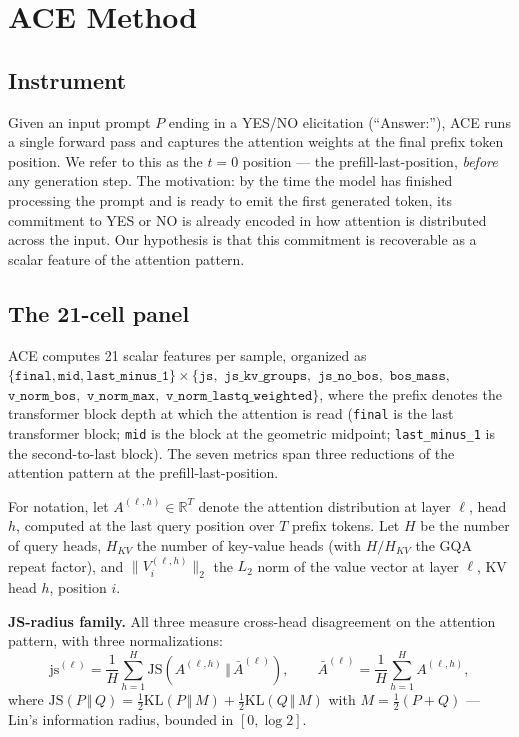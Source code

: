 \documentclass[10pt, letterpaper]{article}
\begin{document}
\section{ACE Method}
\label{sec:method}

\subsection{Instrument}
\label{sec:method:instrument}

Given an input prompt $P$ ending in a YES/NO elicitation
(``Answer:''), ACE runs a single forward pass and captures the
attention weights at the final prefix token position. We refer to this
as the $t{=}0$ position --- the prefill-last-position, \emph{before}
any generation step. The motivation: by the time the model has
finished processing the prompt and is ready to emit the first
generated token, its commitment to YES or NO is already encoded in how
attention is distributed across the input. Our hypothesis is that this
commitment is recoverable as a scalar feature of the attention
pattern.

\subsection{The 21-cell panel}
\label{sec:method:panel}

ACE computes 21 scalar features per sample, organized as
$\{\texttt{final}, \texttt{mid}, \texttt{last\_minus\_1}\} \times
\{\texttt{js},$ $\texttt{js\_kv\_groups},$ $\texttt{js\_no\_bos},$
$\texttt{bos\_mass},$ $\texttt{v\_norm\_bos},$ $\texttt{v\_norm\_max},$
$\texttt{v\_norm\_lastq\_weighted}\}$, where the prefix denotes the
transformer block depth at which the attention is read
(\texttt{final} is the last transformer block; \texttt{mid} is the
block at the geometric midpoint; \texttt{last\_minus\_1} is the
second-to-last block). The seven metrics span three reductions of the
attention pattern at the prefill-last-position.

For notation, let $A^{(\ell,h)} \in \mathbb{R}^T$ denote the attention
distribution at layer $\ell$, head $h$, computed at the last query
position over $T$ prefix tokens. Let $H$ be the number of query
heads, $H_{KV}$ the number of key-value heads (with $H / H_{KV}$ the
GQA repeat factor), and $\|V^{(\ell,h)}_i\|_2$ the $L_2$ norm of the
value vector at layer $\ell$, KV head $h$, position $i$.

\textbf{JS-radius family.} All three measure cross-head disagreement
on the attention pattern, with three normalizations:
\begin{equation}
\mathrm{js}^{(\ell)} = \frac{1}{H} \sum_{h=1}^{H} \mathrm{JS}\!\left( A^{(\ell,h)} \,\Big\Vert\, \bar{A}^{(\ell)} \right),
\qquad
\bar{A}^{(\ell)} = \frac{1}{H} \sum_{h=1}^{H} A^{(\ell,h)},
\end{equation}
where $\mathrm{JS}(P\,\Vert\,Q) = \tfrac{1}{2}\mathrm{KL}(P\,\Vert\,M) + \tfrac{1}{2}\mathrm{KL}(Q\,\Vert\,M)$
with $M = \tfrac{1}{2}(P+Q)$ --- Lin's information radius, bounded in
$[0, \log 2]$.
\end{document}
